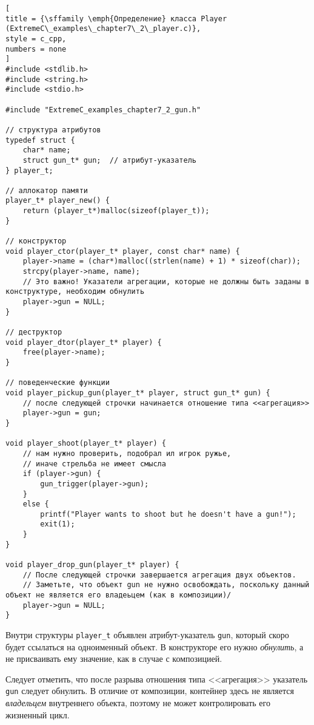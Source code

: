 \documentclass[%
	11pt,
	a4paper,
	utf8,
		]{article}
\begin{document}
\begin{lstlisting}[
title = {\sffamily \emph{Определение} класса Player (ExtremeC\_examples\_chapter7\_2\_player.c)},
style = c_cpp,
numbers = none
]
#include <stdlib.h>
#include <string.h>
#include <stdio.h>

#include "ExtremeC_examples_chapter7_2_gun.h"

// структура атрибутов
typedef struct {
    char* name;
    struct gun_t* gun;  // атрибут-указатель
} player_t;

// аллокатор памяти
player_t* player_new() {
    return (player_t*)malloc(sizeof(player_t));
}

// конструктор
void player_ctor(player_t* player, const char* name) {
    player->name = (char*)malloc((strlen(name) + 1) * sizeof(char));
    strcpy(player->name, name);
    // Это важно! Указатели агрегации, которые не должны быть заданы в конструктуре, необходим обнулить
    player->gun = NULL;
}

// деструктор
void player_dtor(player_t* player) {
    free(player->name);
}

// поведенческие функции
void player_pickup_gun(player_t* player, struct gun_t* gun) {
    // после следующей строчки начинается отношение типа <<агрегация>>
    player->gun = gun;
}

void player_shoot(player_t* player) {
    // нам нужно проверить, подобрал ил игрок ружье,
    // иначе стрельба не имеет смысла
    if (player->gun) {
        gun_trigger(player->gun);
    }
    else {
        printf("Player wants to shoot but he doesn't have a gun!");
        exit(1);
    }
}

void player_drop_gun(player_t* player) {
    // После следующей строчки завершается агрегация двух объектов.
    // Заметьте, что объект gun не нужно освобождать, поскольку данный объект не является его владеьцем (как в композиции)/
    player->gun = NULL;
}
\end{lstlisting}

Внутри структуры \verb|player_t| объявлен атрибут-указатель \verb|gun|, который скоро будет ссылаться на одноименный объект. В конструкторе его нужно \emph{обнулить}, а не присваивать ему значение, как в случае с композицией.

Следует отметить, что после разрыва отношения типа <<агрегация>> указатель \verb|gun| следует обнулить. В отличие от композиции, контейнер здесь не является \emph{владельцем} внутреннего объекта, поэтому не может контролировать его жизненный цикл. 
\end{document}
